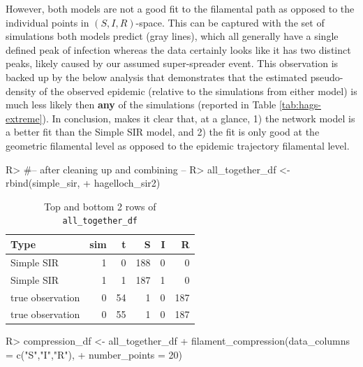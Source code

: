 \documentclass[
  shortnames]{jss}
\begin{document}
However, both models are not a good fit to the filamental path as
opposed to the individual points in \((S, I, R)\)-space. This can be
captured with the set of simulations both models predict (gray lines),
which all generally have a single defined peak of infection whereas the
data certainly looks like it has two distinct peaks, likely caused by
our assumed super-spreader event. This observation is backed up by the
below analysis that demonstrates that the estimated pseudo-density of
the observed epidemic (relative to the simulations from either model) is
much less likely then \textbf{any} of the simulations (reported in Table
\ref{tab:hags-extreme}). In conclusion,  makes it clear
that, at a glance, 1) the  network model is a better fit
than the Simple SIR model, and 2) the fit is only good at the geometric
filamental level as opposed to the epidemic trajectory filamental level.

\begin{CodeChunk}
\begin{CodeInput}
R> #-- after cleaning up and combining --
R> all_together_df <- rbind(simple_sir,
+                          hagelloch_sir2)
\end{CodeInput}
\end{CodeChunk}

\begin{CodeChunk}
\begin{table}[!h]

\caption{\label{tab:cif-all-together-df}Top and bottom 2 rows of \tt{all\_together\_df}}
\centering
\begin{tabular}[t]{lrrrrr}
\toprule
Type & sim & t & S & I & R\\
\midrule
Simple SIR & 1 & 0 & 188 & 0 & 0\\
Simple SIR & 1 & 1 & 187 & 1 & 0\\
true observation & 0 & 54 & 1 & 0 & 187\\
true observation & 0 & 55 & 1 & 0 & 187\\
\bottomrule
\end{tabular}
\end{table}

\end{CodeChunk}

\begin{CodeChunk}
\begin{CodeInput}
R> compression_df <- all_together_df %
+   filament_compression(data_columns = c("S","I","R"), 
+                        number_points = 20)
\end{CodeInput}
\end{CodeChunk}
\end{document}
